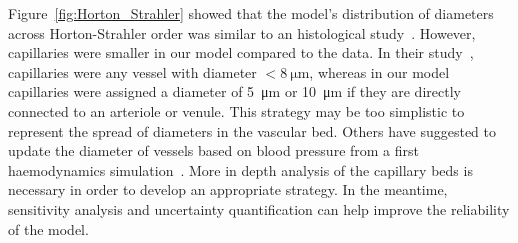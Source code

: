 \documentclass[11pt,]{article}
\begin{document}
Figure~\ref{fig:Horton_Strahler} showed that the model's distribution of diameters across Horton-Strahler order was similar to an histological study~\cite{An2020}.
However, capillaries were smaller in our model compared to the data.
In their study~\cite{An2020}, capillaries were any vessel with diameter $<\SI{8}{\micro\metre}$, whereas in our model capillaries were assigned a diameter of \SI{5}{\micro\metre} or \SI{10}{\micro\metre} if they are directly connected to an arteriole or venule.
This strategy may be too simplistic to represent the spread of diameters in the vascular bed.
Others have suggested to update the diameter of vessels based on blood pressure from a first haemodynamics simulation~\cite{Linninger2013}.
More in depth analysis of the capillary beds is necessary in order to develop an appropriate strategy.
In the meantime, sensitivity analysis and uncertainty quantification can help improve the reliability of the model.
\end{document}
